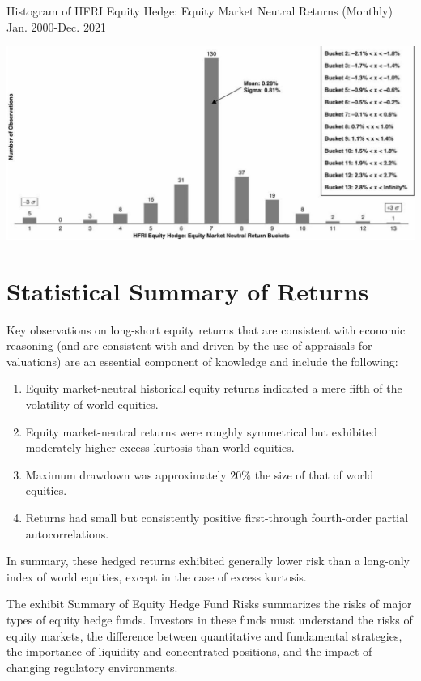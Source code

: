 \documentclass[11pt]{article}
\begin{document}
Histogram of HFRI Equity Hedge: Equity Market Neutral Returns (Monthly) Jan. 2000-Dec. 2021

\begin{center}
\includegraphics[max width=\textwidth]{2024_04_09_92122b5eb0776b473e03g-7(1)}
\end{center}

\section*{Statistical Summary of Returns}
Key observations on long-short equity returns that are consistent with economic reasoning (and are consistent with and driven by the use of appraisals for valuations) are an essential component of knowledge and include the following:

\begin{enumerate}
  \item Equity market-neutral historical equity returns indicated a mere fifth of the volatility of world equities.

  \item Equity market-neutral returns were roughly symmetrical but exhibited moderately higher excess kurtosis than world equities.

  \item Maximum drawdown was approximately $20 \%$ the size of that of world equities.

  \item Returns had small but consistently positive first-through fourth-order partial autocorrelations.

\end{enumerate}

In summary, these hedged returns exhibited generally lower risk than a long-only index of world equities, except in the case of excess kurtosis.

The exhibit Summary of Equity Hedge Fund Risks summarizes the risks of major types of equity hedge funds. Investors in these funds must understand the risks of equity markets, the difference between quantitative and fundamental strategies, the importance of liquidity and concentrated positions, and the impact of changing regulatory environments.
\end{document}
